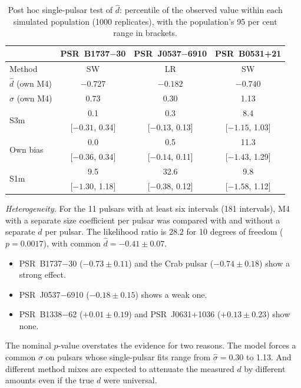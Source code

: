 \documentclass[fleqn,usenatbib]{mnras}
\newcommand{\dhat}{\hat d}
\newcommand{\shat}{\hat\sigma}
\newcommand{\psr}[1]{PSR~#1}
\begin{document}
\begin{table}
\centering
\caption{Post hoc single-pulsar test of $\dhat$: percentile of the observed
value within each simulated population (1000 replicates), with the
population's 95 per cent range in brackets.}
\label{tab:single}
\small
\footnotesize\setlength{\tabcolsep}{3pt}
\begin{tabular}{@{}lccc@{}}
\toprule
 & \psr{B1737$-$30} & \psr{J0537$-$6910} & \psr{B0531+21}\\
\midrule
Method & SW & LR & SW\\
$\dhat$ (own M4) & $-0.727$ & $-0.182$ & $-0.740$\\
$\shat$ (own M4) & 0.73 & 0.30 & 1.13\\
\midrule
\multirow{2}{*}{S3m} & 0.1 & 0.3 & 8.4\\
 & {\scriptsize[$-0.31$, 0.34]} & {\scriptsize[$-0.13$, 0.13]} & {\scriptsize[$-1.15$, 1.03]}\\
\multirow{2}{*}{Own bias} & 0.0 & 0.5 & 11.3\\
 & {\scriptsize[$-0.36$, 0.34]} & {\scriptsize[$-0.14$, 0.11]} & {\scriptsize[$-1.43$, 1.29]}\\
\multirow{2}{*}{S1m} & 9.5 & 32.6 & 9.8\\
 & {\scriptsize[$-1.30$, 1.18]} & {\scriptsize[$-0.38$, 0.12]} & {\scriptsize[$-1.58$, 1.12]}\\
\bottomrule
\end{tabular}
\end{table}

\emph{Heterogeneity.} For the 11 pulsars with at least six intervals (181
intervals), M4 with a separate size coefficient per pulsar was compared with
and without a separate $d$ per pulsar. The likelihood ratio is $28.2$ for
10 degrees of freedom ($p=0.0017$), with common $\dhat=-0.41\pm0.07$.
\begin{itemize}
\item \psr{B1737$-$30} ($-0.73\pm0.11$) and the Crab pulsar ($-0.74\pm0.18$)
show a strong effect.
\item \psr{J0537$-$6910} ($-0.18\pm0.15$) shows a weak one.
\item \psr{B1338$-$62} ($+0.01\pm0.19$) and \psr{J0631+1036} ($+0.13\pm
0.23$) show none.
\end{itemize}
The nominal $p$-value overstates the evidence for two reasons. The model
forces a common $\sigma$ on pulsars whose single-pulsar fits range from
$\shat=0.30$ to 1.13. And different method mixes are expected to attenuate
the measured $d$ by different amounts even if the true $d$ were universal.
\end{document}
